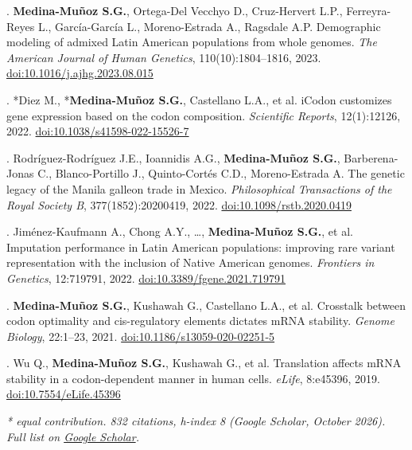 \documentclass{tufte-handout}
\begin{document}
\begin{fullwidth}
. \textbf{Medina-Mu\~noz S.G.}, Ortega-Del Vecchyo D., Cruz-Hervert L.P., Ferreyra-Reyes L., Garc\'ia-Garc\'ia L., Moreno-Estrada A., Ragsdale A.P. Demographic modeling of admixed Latin American populations from whole genomes. \textit{The American Journal of Human Genetics}, 110(10):1804--1816, 2023. \href{https://doi.org/10.1016/j.ajhg.2023.08.015}{doi:10.1016/j.ajhg.2023.08.015}
\par\vspace{3pt}

. *Diez M., *\textbf{Medina-Mu\~noz S.G.}, Castellano L.A., et al. iCodon customizes gene expression based on the codon composition. \textit{Scientific Reports}, 12(1):12126, 2022. \href{https://doi.org/10.1038/s41598-022-15526-7}{doi:10.1038/s41598-022-15526-7}
\par\vspace{3pt}

. Rodr\'iguez-Rodr\'iguez J.E., Ioannidis A.G., \textbf{Medina-Mu\~noz S.G.}, Barberena-Jonas C., Blanco-Portillo J., Quinto-Cort\'es C.D., Moreno-Estrada A. The genetic legacy of the Manila galleon trade in Mexico. \textit{Philosophical Transactions of the Royal Society B}, 377(1852):20200419, 2022. \href{https://doi.org/10.1098/rstb.2020.0419}{doi:10.1098/rstb.2020.0419}
\par\vspace{3pt}

. Jim\'enez-Kaufmann A., Chong A.Y., \ldots, \textbf{Medina-Mu\~noz S.G.}, et al. Imputation performance in Latin American populations: improving rare variant representation with the inclusion of Native American genomes. \textit{Frontiers in Genetics}, 12:719791, 2022. \href{https://doi.org/10.3389/fgene.2021.719791}{doi:10.3389/fgene.2021.719791}
\par\vspace{3pt}

. \textbf{Medina-Mu\~noz S.G.}, Kushawah G., Castellano L.A., et al. Crosstalk between codon optimality and cis-regulatory elements dictates mRNA stability. \textit{Genome Biology}, 22:1--23, 2021. \href{https://doi.org/10.1186/s13059-020-02251-5}{doi:10.1186/s13059-020-02251-5}
\par\vspace{3pt}

. Wu Q., \textbf{Medina-Mu\~noz S.G.}, Kushawah G., et al. Translation affects mRNA stability in a codon-dependent manner in human cells. \textit{eLife}, 8:e45396, 2019. \href{https://doi.org/10.7554/eLife.45396}{doi:10.7554/eLife.45396}
\par\vspace{3pt}

\textit{* equal contribution. 832 citations, h-index 8 (Google Scholar, October 2026). Full list on \href{https://scholar.google.com/citations?user=XW3Sz1kAAAAJ&hl=es&oi=ao}{Google Scholar}.}
\end{fullwidth}
\end{document}
